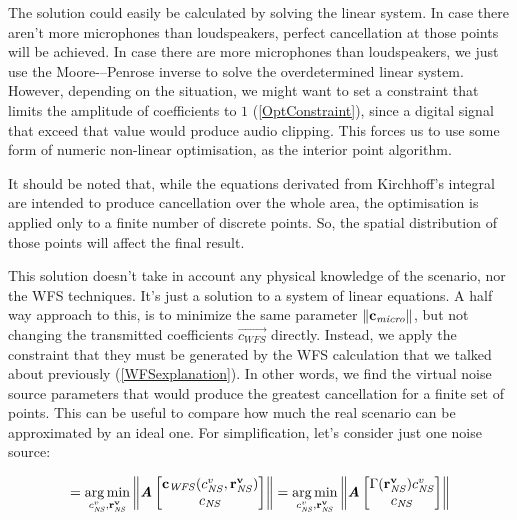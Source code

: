 The solution could easily be calculated by solving the linear system. In case there aren't more microphones than loudspeakers, perfect cancellation at those points will be achieved. In case there are more microphones than loudspeakers, we just use the Moore-–Penrose inverse to solve the overdetermined linear system. However, depending on the situation, we might want to set a constraint that limits the amplitude of coefficients to $1$ (\autoref{OptConstraint}), since a digital signal that exceed that value would produce audio clipping. This forces us to use some form of numeric non-linear optimisation, as the interior point algorithm.

It should be noted that, while the equations derivated from Kirchhoff's integral are intended to produce cancellation over the whole area, the optimisation is applied only to a finite number of discrete points. So, the spatial distribution of those points will affect the final result.

This solution doesn't take in account any physical knowledge of the scenario, nor the WFS techniques. It's just a solution to a system of linear equations. A half way approach to this, is to minimize the same parameter $\left\| \mathbf{c_\mathit{micro}} \right\|$, but not changing the transmitted coefficients $\vec{c_{\mathit{WFS}}}$ directly. Instead, we apply the constraint that they must be generated by the WFS calculation that we talked about previously (\autoref{WFSexplanation}). In other words, we find the virtual noise source parameters that would produce the greatest cancellation for a finite set of points. This can be useful to compare how much the real scenario can be approximated by an ideal one. For simplification, let's consider just one noise source:

\begin{equation}
[\cnsScalar^v, \vec{r_{\mathit{NS}}^v}] =
\argmin_{\cnsScalar^v, \vec{r_{\mathit{NS}}^v}}
\norm{\myMatrix{A}
	\begin{bmatrix}
	\vec{c_\mathit{WFS}}(\cnsScalar^v, \vec{r_{\mathit{NS}}^v})\\
	\cnsScalar\\
	\end{bmatrix}
} =
\argmin_{\cnsScalar^v, \vec{r_{\mathit{NS}}^v}}
\norm{\myMatrix{A}
	\begin{bmatrix}
	\wfsNormCoef[mat](\vec{r_{\mathit{NS}}^v})\cnsScalar^v\\
	\cnsScalar\\
	\end{bmatrix}
}
\end{equation}


